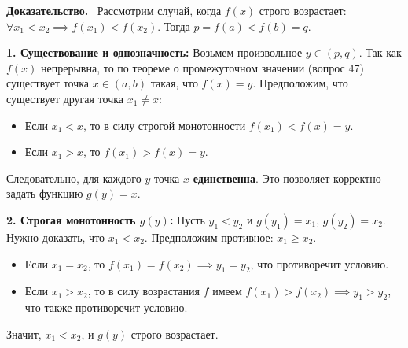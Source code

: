 \documentclass[a4paper,12pt]{article}
\newcommand{\myproof}{\textbf{Доказательство.}\ }
\begin{document}
	\begin{center}
	\end{center}
	
	\vspace{0.5cm}
	\myproof
	Рассмотрим случай, когда $f(x)$ строго возрастает: $\forall x_1 < x_2 \implies f(x_1) < f(x_2)$. Тогда $p = f(a) < f(b) = q$.
	
	\vspace{0.5cm}
	\textbf{1. Существование и однозначность:}
	Возьмем произвольное $y \in (p, q)$. Так как $f(x)$ непрерывна, то по теореме о промежуточном значении (вопрос 47) существует точка $x \in (a, b)$ такая, что $f(x) = y$. 
	Предположим, что существует другая точка $x_1 \neq x$:
	\begin{itemize}
		\item Если $x_1 < x$, то в силу строгой монотонности $f(x_1) < f(x) = y$.
		\item Если $x_1 > x$, то $f(x_1) > f(x) = y$.
	\end{itemize}
	Следовательно, для каждого $y$ точка $x$ \textbf{единственна}. Это позволяет корректно задать функцию $g(y) = x$.
	
	\vspace{0.5cm}
	\textbf{2. Строгая монотонность $g(y)$:}
	Пусть $y_1 < y_2$ и $g(y_1) = x_1$, $g(y_2) = x_2$. Нужно доказать, что $x_1 < x_2$.
	Предположим противное: $x_1 \geq x_2$.
	\begin{itemize}
		\item Если $x_1 = x_2$, то $f(x_1) = f(x_2) \implies y_1 = y_2$, что противоречит условию.
		\item Если $x_1 > x_2$, то в силу возрастания $f$ имеем $f(x_1) > f(x_2) \implies y_1 > y_2$, что также противоречит условию.
	\end{itemize}
	Значит, $x_1 < x_2$, и $g(y)$ строго возрастает.
	
\end{document}
